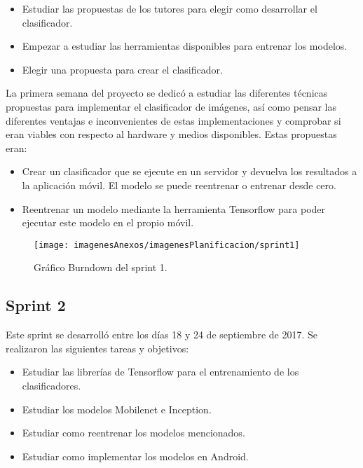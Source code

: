 \begin{itemize}
	\item Estudiar las propuestas de los tutores para elegir como desarrollar el clasificador.
	\item Empezar a estudiar las herramientas disponibles para entrenar los modelos.
	\item Elegir una propuesta para crear el clasificador.
\end{itemize}

La primera semana del proyecto se dedicó a estudiar las diferentes técnicas propuestas para implementar el clasificador de imágenes, así como pensar las diferentes ventajas e inconvenientes de estas implementaciones y comprobar si eran viables con respecto al hardware y medios disponibles. Estas propuestas eran:
\begin{itemize}
	\item Crear un clasificador que se ejecute en un servidor y devuelva los resultados a la aplicación móvil. El modelo se puede reentrenar o entrenar desde cero.
	\item Reentrenar un modelo mediante la herramienta Tensorflow para poder ejecutar este modelo en el propio móvil.
\end{itemize}

\begin{figure}[h]
    \begin{center}%
        \begin{center}%
          \texttt{[image: imagenesAnexos/imagenesPlanificacion/sprint1]}%
          \caption{Gráfico Burndown del sprint 1.}%
          \label{figSprint1}%
        \end{center}%
  	\end{center}%
\end{figure}%
\newpage

\subsection{Sprint 2}

Este sprint se desarrolló entre los días 18 y 24 de septiembre de 2017. Se realizaron las siguientes tareas y objetivos:

\begin{itemize}
	\item Estudiar las librerías de Tensorflow para el entrenamiento de los clasificadores.
	\item Estudiar los modelos Mobilenet e Inception.
	\item Estudiar como reentrenar los modelos mencionados.
	\item Estudiar como implementar los modelos en Android.
\end{itemize}

